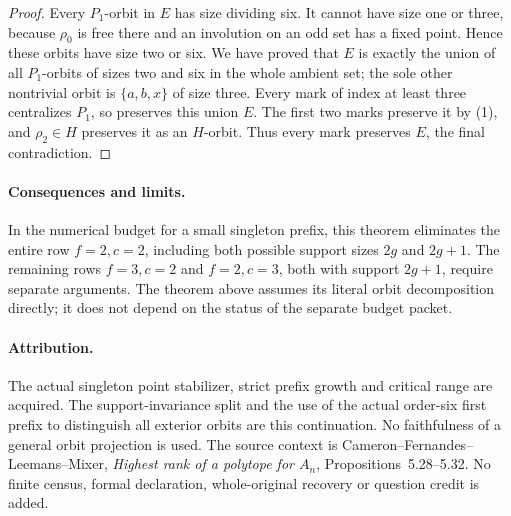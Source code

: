 \documentclass[11pt,a4paper]{article}
\begin{document}
\begin{proof}
Every $P_1$-orbit in $E$ has size dividing six. It cannot
have size one or three, because $\rho_0$ is free there and
an involution on an odd set has a fixed point. Hence these
orbits have size two or six. We have proved that $E$ is
exactly the union of all $P_1$-orbits of sizes two and six
in the whole ambient set; the sole other nontrivial orbit is
$\{a,b,x\}$ of size three.
Every mark of index at least three centralizes $P_1$, so
preserves this union $E$. The first two marks preserve it
by (1), and $\rho_2\in H$ preserves it as an $H$-orbit.
Thus every mark preserves $E$, the final contradiction.
\end{proof}

\paragraph{Consequences and limits.}
In the numerical budget for a small singleton prefix, this theorem
eliminates the entire row $f=2,c=2$, including both possible
support sizes $2g$ and $2g+1$. The remaining rows
$f=3,c=2$ and $f=2,c=3$, both with support $2g+1$, require
separate arguments. The theorem above assumes its literal
orbit decomposition directly; it does not depend on the status
of the separate budget packet.

\paragraph{Attribution.}
The actual singleton point stabilizer, strict prefix growth and
critical range are acquired. The support-invariance split and the
use of the actual order-six first prefix to distinguish all exterior
orbits are this continuation. No faithfulness of a general orbit
projection is used. The source context is
Cameron--Fernandes--Leemans--Mixer, \emph{Highest rank of a polytope
for $A_n$}, Propositions~5.28--5.32.
No finite census, formal declaration, whole-original recovery or
question credit is added.
\end{document}
